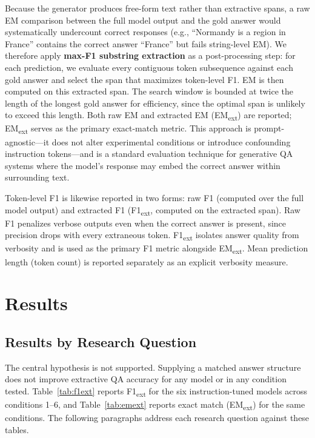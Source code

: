 \documentclass{article}
\begin{document}
Because the generator produces free-form text rather than extractive spans, a raw EM comparison between the full model output and the gold answer would systematically undercount correct responses (e.g., ``Normandy is a region in France'' contains the correct answer ``France'' but fails string-level EM). We therefore apply \textbf{max-F1 substring extraction} as a post-processing step: for each prediction, we evaluate every contiguous token subsequence against each gold answer and select the span that maximizes token-level F1. EM is then computed on this extracted span. The search window is bounded at twice the length of the longest gold answer for efficiency, since the optimal span is unlikely to exceed this length. Both raw EM and extracted EM (EM\textsubscript{ext}) are reported; EM\textsubscript{ext} serves as the primary exact-match metric. This approach is prompt-agnostic---it does not alter experimental conditions or introduce confounding instruction tokens---and is a standard evaluation technique for generative QA systems where the model's response may embed the correct answer within surrounding text.

Token-level F1 is likewise reported in two forms: raw F1 (computed over the full model output) and extracted F1 (F1\textsubscript{ext}, computed on the extracted span). Raw F1 penalizes verbose outputs even when the correct answer is present, since precision drops with every extraneous token. F1\textsubscript{ext} isolates answer quality from verbosity and is used as the primary F1 metric alongside EM\textsubscript{ext}. Mean prediction length (token count) is reported separately as an explicit verbosity measure.

\section{Results}

\subsection{Results by Research Question}

The central hypothesis is not supported. Supplying a matched answer structure does not improve extractive QA accuracy for any model or in any condition tested. Table~\ref{tab:f1ext} reports F1\textsubscript{ext} for the six instruction-tuned models across conditions 1--6, and Table~\ref{tab:emext} reports exact match (EM\textsubscript{ext}) for the same conditions. The following paragraphs address each research question against these tables.
\end{document}
